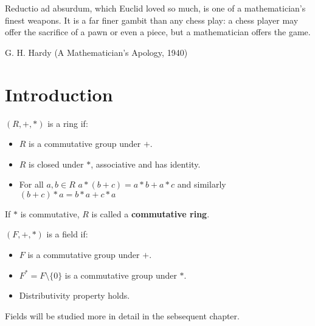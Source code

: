 \epigraph{Reductio ad absurdum, which Euclid loved so much, is one of a mathematician's finest weapons. It is a far finer gambit than any chess play: a chess player may offer the sacrifice of a pawn or even a piece, but a mathematician offers the game.}{G. H. Hardy (A Mathematician's Apology, 1940)}
\par
\section{Introduction}
\begin{definition} \label{def:rings}
  $( R, +, * )$ is a ring if:
  \begin{itemize}
    \item $R$ is a commutative group under $+$.
    \item $R$ is closed under $*$, associative and has identity.
    \item For all $a, b \in R$ $a * (b + c) = a * b + a * c$ and similarly $(b+c) * a = b * a + c * a$
  \end{itemize}
\end{definition}
If $*$ is commutative, $R$ is called a \textbf{commutative ring}.

\begin{definition} \label{def:fields}
  $( F, +, * )$ is a field if:
  \begin{itemize}
    \item $F$ is a commutative group under $+$.
    \item $F^{*} = F \setminus \{ 0 \}$ is a commutative group under $*$.
    \item Distributivity property holds.
  \end{itemize}
\end{definition}
Fields will be studied more in detail in the sebsequent chapter.

